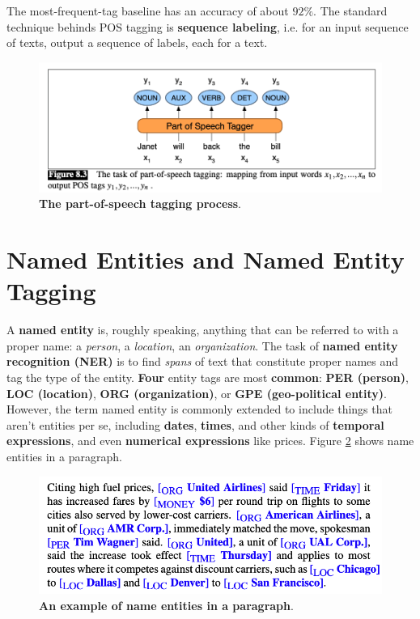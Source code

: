 \documentclass[11pt]{article}
\begin{document}
The most-frequent-tag baseline has an accuracy of about $92\%$. The standard technique behinds POS tagging is \textbf{sequence labeling}, i.e. for an input sequence of texts, output a sequence of labels, each for a text. 

\begin{figure}
\begin{minipage}[t]{1\linewidth}
  \centering
  \centerline{\includegraphics[scale = 0.4]{pos_tag_example.png}}
\end{minipage}
\caption{\footnotesize{\textbf{The part-of-speech tagging process}.}}
\label{fig: pos_tag_example}
\end{figure}

\section{Named Entities and Named Entity Tagging}
A \textbf{named entity} is, roughly speaking, anything that can be referred to with a proper name: a \emph{person}, a \emph{location}, an \emph{organization}. The task of \textbf{named entity recognition (NER)} is to find \emph{spans} of text that constitute proper names and tag the type of the entity. \textbf{Four} entity tags are most \textbf{common}: \textbf{PER (person)}, \textbf{LOC (location)}, \textbf{ORG (organization)}, or \textbf{GPE (geo-political entity)}. However, the term named entity is commonly extended to include things that aren’t entities per se, including \textbf{dates},
\textbf{times}, and other kinds of \textbf{temporal expressions}, and even \textbf{numerical expressions} like prices. Figure \ref{fig: ner_example} shows name entities in a paragraph. 

\begin{figure}
\begin{minipage}[t]{1\linewidth}
  \centering
  \centerline{\includegraphics[scale = 0.4]{ner_example.png}}
\end{minipage}
\caption{\footnotesize{\textbf{An example of name entities in a paragraph}.}}
\label{fig: ner_example}
\end{figure}
\end{document}
